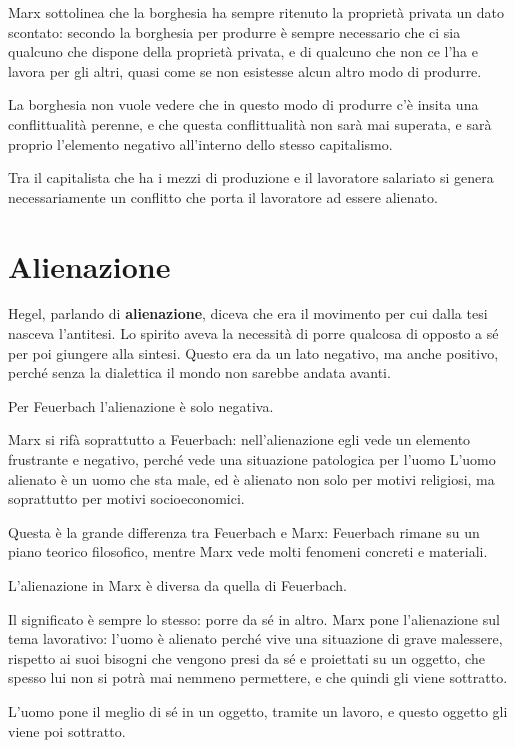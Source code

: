 \documentclass[a4paper, twoside, titlepage]{book}
\begin{document}
Marx sottolinea che la borghesia ha sempre ritenuto la proprietà privata un dato scontato: secondo la borghesia per produrre è sempre necessario che ci sia qualcuno che dispone della proprietà privata, e di qualcuno che non ce l'ha e lavora per gli altri, quasi come se non esistesse alcun altro modo di produrre.

La borghesia non vuole vedere che in questo modo di produrre c'è insita una conflittualità perenne, e che questa conflittualità non sarà mai superata, e sarà proprio l'elemento negativo all'interno dello stesso capitalismo.

Tra il capitalista che ha i mezzi di produzione e il lavoratore salariato si genera necessariamente un conflitto che porta il lavoratore ad essere alienato.

\section{Alienazione}

Hegel, parlando di \textbf{alienazione}, diceva che era il movimento per cui dalla tesi nasceva l'antitesi. Lo spirito aveva la necessità di porre qualcosa di opposto a sé per poi giungere alla sintesi.
Questo era da un lato negativo, ma anche positivo, perché senza la dialettica il mondo non sarebbe andata avanti.

Per Feuerbach l'alienazione è solo negativa.

Marx si rifà soprattutto a Feuerbach: nell'alienazione egli vede un elemento frustrante e negativo, perché vede una situazione patologica per l'uomo
L'uomo alienato è un uomo che sta male, ed è alienato non solo per motivi religiosi, ma soprattutto per motivi socioeconomici.

Questa è la grande differenza tra Feuerbach e Marx: Feuerbach rimane su un piano teorico filosofico, mentre Marx vede molti fenomeni concreti e materiali.

L’alienazione in Marx è diversa da quella di Feuerbach.

Il significato è sempre lo stesso: porre da sé in altro.
Marx pone l’alienazione sul tema lavorativo: l’uomo è alienato perché vive una situazione di grave malessere, rispetto ai suoi bisogni che vengono presi da sé e proiettati su un oggetto, che spesso lui non si potrà mai nemmeno permettere, e che quindi gli viene sottratto.

L’uomo pone il meglio di sé in un oggetto, tramite un lavoro, e questo oggetto gli viene poi sottratto.
\end{document}
